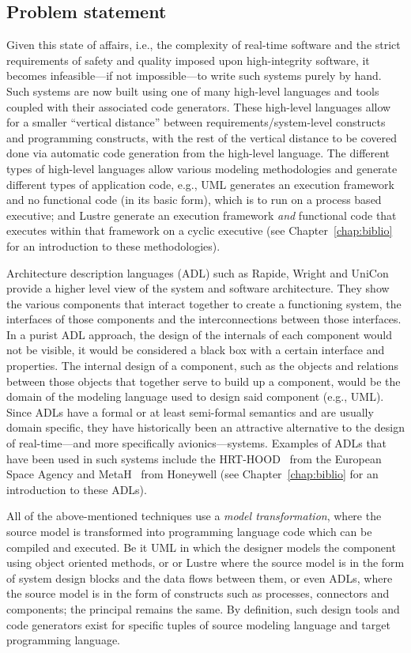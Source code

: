 \subsection{Problem statement}
Given this state of affairs, i.e., the complexity of real-time
software and the strict requirements of safety and quality imposed
upon high-integrity software, it becomes infeasible---if not
impossible---to write such systems purely by hand. Such systems are
now built using one of many high-level languages and tools coupled
with their associated code generators. These high-level languages
allow for a smaller ``vertical distance'' between
requirements/system-level constructs and programming constructs, with
the rest of the vertical distance to be covered done via automatic
code generation from the high-level language. The different types of
high-level languages allow various modeling methodologies and generate
different types of application code, e.g., UML generates an execution
framework and no functional code (in its basic form), which is to run
on a process based executive; \simu and Lustre generate an execution
framework \emph{and} functional code that executes within that
framework on a cyclic executive (see Chapter~\ref{chap:biblio} for an
introduction to these methodologies).

Architecture description languages (ADL) such as Rapide, Wright and
UniCon~\cite{clements@iwssd96} provide a higher level view of the
system and software architecture. They show the various components
that interact together to create a functioning system, the interfaces
of those components and the interconnections between those
interfaces. In a purist ADL approach, the design of the internals of
each component would not be visible, it would be considered a black
box with a certain interface and properties. The internal design of a
component, such as the objects and relations between those objects
that together serve to build up a component, would be the domain of
the modeling language used to design said component (e.g., UML). Since
ADLs have a formal or at least semi-formal semantics and are usually
domain specific, they have historically been an attractive alternative
to the design of real-time---and more specifically
avionics---systems. Examples of ADLs that have been used in such
systems include the HRT-HOOD~\cite{burns@rts94} from the European
Space Agency and MetaH~\cite{metah-manual} from Honeywell (see
Chapter~\ref{chap:biblio} for an introduction to these ADLs).

All of the above-mentioned techniques use a \emph{model
  transformation}, where the source model is transformed into
programming language code which can be compiled and executed. Be it
UML in which the designer models the component using object oriented
methods, or \simu or Lustre where the source model is in the form of
system design blocks and the data flows between them, or even ADLs,
where the source model is in the form of constructs such as processes,
connectors and components; the principal remains the same. By
definition, such design tools and code generators exist for specific
tuples of source modeling language and target programming language.

